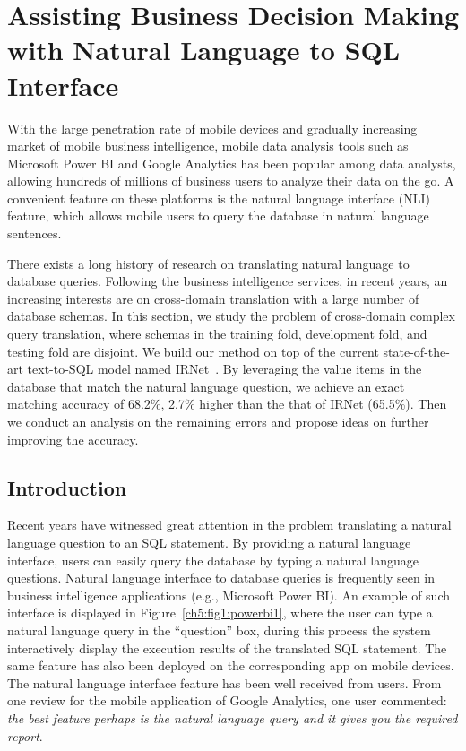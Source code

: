 
\chapter{Assisting Business Decision Making with Natural Language to SQL Interface}
\label{ch5:nl2sql}

With the large penetration rate of mobile devices and gradually increasing market of mobile business intelligence, mobile data analysis tools such as Microsoft Power BI and Google Analytics has been popular among data analysts, allowing hundreds of millions of business users to analyze their data on the go. A convenient feature on these platforms is the natural language interface (NLI) feature, which allows mobile users to query the database in natural language sentences. 

There exists a long history of research on translating natural language to database queries. Following the business intelligence services, in recent years, an increasing interests are on cross-domain translation with a large number of database schemas. In this section, we study the problem of cross-domain complex query translation, where schemas in the training fold, development fold, and testing fold are disjoint. We build our method on top of the current state-of-the-art text-to-SQL model named IRNet~\cite{guo2019towards}. By leveraging the value items in the database that match the natural language question, we achieve an exact matching accuracy of 68.2\%, 2.7\% higher than the that of IRNet (65.5\%). Then we conduct an analysis on the remaining errors and propose ideas on further improving the accuracy. 

\section{Introduction}

Recent years have witnessed great attention in the problem translating a natural language question to an SQL statement. By providing a natural language interface, users can easily query the database by typing a natural language questions. Natural language interface to database queries is frequently seen in business intelligence applications (e.g., Microsoft Power BI). An example of such interface is displayed in Figure~\ref{ch5:fig1:powerbi1}, where the user can type a natural language query in the ``question'' box, during this process the system interactively display the execution results of the translated SQL statement. The same feature has also been deployed on the corresponding app on mobile devices. The natural language interface feature has been well received from users. From one review for the mobile application of Google Analytics, one user commented: \emph{the best feature perhaps is the natural language query and it gives you the required report}. 

